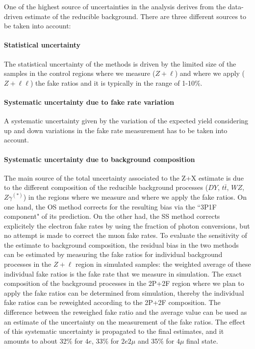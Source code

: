 One of the highest source of uncertainties in the analysis derives from the data-driven estimate of the reducible background.
There are three different sources to be taken into account:

\paragraph*{Statistical uncertainty}
The statistical uncertainty of the methods is driven by the limited size of the samples in the control regions where we measure ($Z + \ell$) and where we apply ($Z + \ell\ell$) the fake ratios and it is typically in the range of 1-10\%. 

\paragraph*{Systematic uncertainty due to fake rate variation}
A systematic uncertainty given by the variation of the expected yield considering up and down variations in the fake rate measurement has to be taken into account.

\paragraph*{Systematic uncertainty due to background composition}
The main source of the total uncertainty associated to the Z+X estimate is due to the different composition of the reducible background processes ($DY$, $t \bar{t}$, $WZ$, $Z\gamma^{(*)}$) in the regions where we measure and where we apply the fake ratios. On one hand, the OS method corrects for the resulting bias via the ``3P1F component" of its prediction. 
On the other had, the SS method corrects explicitely the electron fake rates by using the fraction of photon conversions, but no attempt is made to correct the muon fake rates.
To evaluate the sensitivity of the estimate to background composition, the residual bias in the two methods can be estimated by measuring the fake ratios for individual background processes in the $Z + \ell$ region in simulated samples: the weighted average of these individual fake ratios is the fake rate that we measure in simulation. The exact composition of the background processes in the 2P+2F region where we plan to apply the fake ratios can be determined from simulation, thereby the individual fake ratios can be reweighted according to the 2P+2F composition. The difference between the reweighed fake ratio and the average value can be used as an estimate of the uncertainty on the measurement of the fake ratios. 
The effect of this systematic uncertainty is propagated to the final estimates, and it amounts to about 32\% for $4e$, 33\% for $2e2\mu$ and 35\% for $4\mu$ final state. 

